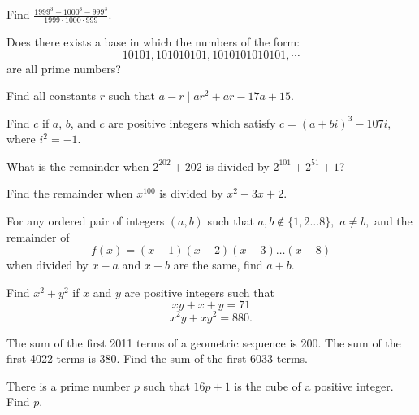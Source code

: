 \documentclass[mast]{lucky}
\begin{document}
\begin{prob}[]{2}
Find $\frac{1999^3-1000^3-999^3}{1999\cdot 1000\cdot 999}.$
\end{prob}

\begin{prob}[PAMO 2003/3]{2}
Does there exists a base in which the numbers of the form:
\[ 10101, 101010101, 1010101010101,\cdots \]
are all prime numbers?
\end{prob}

\begin{prob}[]{2}
Find all constants $r$ such that $a-r\mid ar^2+ar-17a+15.$
\end{prob}

\begin{prob}[AIME 1985/3]{2}
Find $c$ if $a$, $b$, and $c$ are positive integers which satisfy $c=(a + bi)^3 - 107i$, where $i^2 = -1$.
\end{prob}
    
\begin{req}[AMC 10B 2020/22]{2}
What is the remainder when $2^{202}+202$ is divided by $2^{101}+2^{51}+1$?
\end{req}

\begin{prob}[AHSME 1969/34]{2}
Find the remainder when $x^{100}$ is divided by $x^2-3x+2.$
\end{prob}

\begin{prob}{3}
For any ordered pair of integers $(a,b)$ such that $a,b\not\in \{1,2\dots 8\},$ $a\neq b,$ and the remainder of $$f(x)=(x-1)(x-2)(x-3)\dots(x-8)$$ when divided by $x-a$ and $x-b$ are the same, find $a+b.$
\end{prob}

\begin{prob}[AIME 1991/1]{3}
Find $x^2+y^2$ if $x$ and $y$ are positive integers such that
\[xy+x+y = 71\]
\[x^2y+xy^2 = 880.\]
\end{prob}

\begin{prob}[AIME II 2011/5]{3}
The sum of the first 2011 terms of a geometric sequence is 200. The sum of the first 4022 terms is 380. Find the sum of the first 6033 terms.
\end{prob}

\begin{prob}[AIME I 2015/3]{4}
There is a prime number $p$ such that $16p + 1$ is the cube of a positive integer. Find $p.$
\end{prob}
\end{document}
